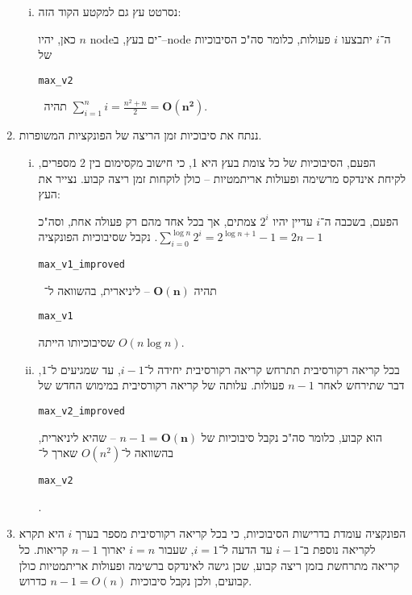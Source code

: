 \documentclass[]{article}
\newcommand\en[1] {\begin{otherlanguage}{english}#1\end{otherlanguage}}
\newcommand\sen   {\begin{otherlanguage}{english}}
\newcommand\she   {\end{otherlanguage}}
\newcommand\ttt[1]{\en{\footnotesize\texttt{#1}\normalsize}}
\newcommand\logn  {\log n}
\begin{document}
\begin{enumerate}[A']
\begin{enumerate}[i.]
			\item נסרטט עץ גם למקטע הקוד הזה: 
			\begin{center}\sen{}\she\end{center}
			כאן, יהיו $n$ node־ים בעץ, ב–node ה־$i$ יתבצעו $i$ פעולות, כלומר סה"כ הסיבוכיות של \ttt{max\_v2} \ תהיה $\sum_{i = 1}^{n}i = \frac{n^2 + n}{2} = \bm{O(n^2)}$. 
		\end{enumerate}
		\item ננתח את סיבוכיות זמן הריצה של הפונקציות המשופרות. 
		\begin{enumerate}[i.]
			\item הפעם, הסיבוכיות של כל צומת בעץ היא 1, כי חישוב מקסימום בין 2 מספרים, לקיחת אינדקס מרשימה ופעולות אריתמטיות – כולן לוקחות זמן ריצה קבוע. נצייר את העץ: 
					\begin{center}\sen{}\she\end{center}
			הפעם, בשכבה ה־$i$ עדיין יהיו $2^i$ צמתים, אך בכל אחד מהם רק פעולה אחת, וסה"כ $\sum_{i = 0}^{\logn} 2^i = 2^{\logn + 1} - 1 = 2n - 1$. נקבל שסיבוכיות הפונקציה \ttt{max\_v1\_improved} \ תהיה $\bm{O(n)}$ – ליניארית, בהשוואה ל־\ttt{max\_v1} שסיבוכיותו הייתה $O(n \logn)$. 
			\item בכל קריאה רקורסיבית תתרחש קריאה רקורסיבית יחידה ל־$i - 1$, עד שמגיעים ל־$1$, דבר שתירחש לאחר $n - 1$ פעולות. עלותה של קריאה רקורסיבית במימוש החדש של \ttt{max\_v2\_improved} הוא קבוע, כלומר סה"כ נקבל סיבוכיות של $n - 1 = \bm{O(n)}$ – שהיא ליניארית, בהשוואה ל־$O(n^2)$ שארך ל־\ttt{max\_v2}. 
		\end{enumerate}
		\item הפונקציה עומדת בדרישות הסיבוכיות, כי בכל קריאה רקורסיבית מספר בערך $i$ היא תקרא לקריאה נוספת ב־$i - 1$ עד הדעה ל־$i = 1$, שעבור $i = n$ יארוך $n - 1$ קריאות. כל קריאה מתרחשת בזמן ריצה קבוע, שכן גישה לאינדקס ברשימה ופעולות אריתמטיות כולן קבועים, ולכן נקבל סיבוכיות $n - 1 = O(n)$ כדרוש. 
		

\end{enumerate}
\end{document}
